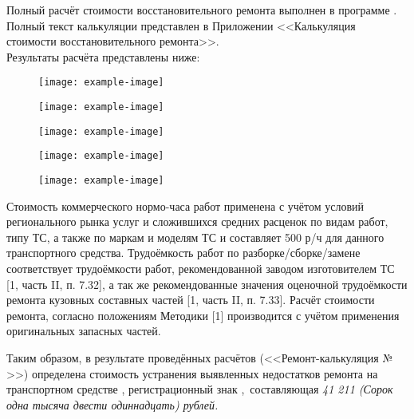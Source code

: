 {\par Полный расчёт стоимости восстановительного ремонта выполнен в программе \auda.\\
Полный текст калькуляции представлен в Приложении  <<Калькуляция стоимости восстановительного ремонта>>.\\ 
\indent Результаты расчёта представлены ниже:
%
\begin{figure}[H]
	\centering
	\texttt{[image: example-image]}
\end{figure}
\begin{figure}[H]
	\centering
	\texttt{[image: example-image]}
\end{figure}
\begin{figure}[H]
	\centering
	\texttt{[image: example-image]}
\end{figure}
\begin{figure}[H]
	\centering
	\texttt{[image: example-image]}
\end{figure}
\begin{figure}[H]
	\centering
	\texttt{[image: example-image]}
\end{figure}
\medskip
\renewcommand\baselinestretch{1.2}\small\normalsize
Стоимость коммерческого нормо-часа работ применена  с учётом условий регионального рынка услуг и сложившихся средних расценок по видам работ, типу ТС, а также по маркам и моделям ТС  и   составляет 500 р/ч для данного транспортного средства. Трудоёмкость работ по разборке/сборке/замене  соответствует трудоёмкости работ, рекомендованной заводом изготовителем ТС [1, часть II, п. 7.32], а так же рекомендованные значения оценочной трудоёмкости ремонта кузовных составных частей [1, часть II, п. 7.33]. Расчёт стоимости ремонта, согласно положениям Методики [1] производится с учётом  применения оригинальных запасных частей. %
%
\par Таким образом, в результате проведённых расчётов (<<Ремонт-калькуляция № \NomerDoc>>) определена стоимость устранения выявленных недостатков ремонта на транспортном средстве  , регистрационный  знак ,\, составляющая  \textit{41 211 (Сорок одна тысяча двести одиннадцать) рублей.}
 

}
